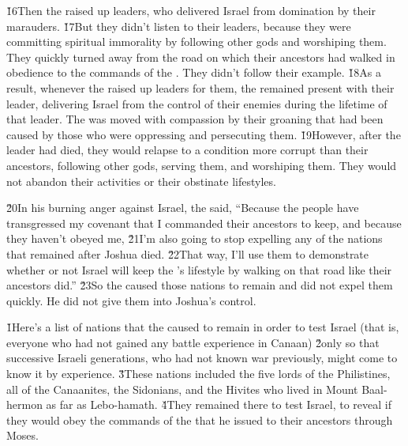 \v{16}Then the  raised up leaders, who delivered Israel from domination by their marauders. \v{17}But they didn't listen to their leaders, because they were committing spiritual immorality by following other gods and worshiping them. They quickly turned away from the road on which their ancestors had walked in obedience to the commands of the . They didn't follow their example. \v{18}As a result, whenever the  raised up leaders for them, the  remained present with their leader, delivering Israel from the control of their enemies during the lifetime of that leader. The  was moved with compassion by their groaning that had been caused by those who were oppressing and persecuting them. \v{19}However, after the leader had died, they would relapse to a condition more corrupt than their ancestors, following other gods, serving them, and worshiping them. They would not abandon their activities or their obstinate lifestyles.

\v{20}In his burning anger against Israel, the  said, ``Because the people have transgressed my covenant that I commanded their ancestors to keep, and because they haven't obeyed me, \v{21}I'm also going to stop expelling any of the nations that remained after Joshua died. \v{22}That way, I'll use them to demonstrate whether or not Israel will keep the 's lifestyle by walking on that road like their ancestors did.'' \v{23}So the  caused those nations to remain and did not expel them quickly. He did not give them into Joshua's control.

\v{1}Here's a list of nations that the  caused to remain in order to test Israel (that is, everyone who had not gained any battle experience in Canaan) \v{2}only so that successive Israeli generations, who had not known war previously, might come to know it by experience. \v{3}These nations included the five lords of the Philistines, all of the Canaanites, the Sidonians, and the Hivites who lived in Mount Baal-hermon as far as Lebo-hamath. \v{4}They remained there to test Israel, to reveal if they would obey the commands of the  that he issued to their ancestors through Moses.

